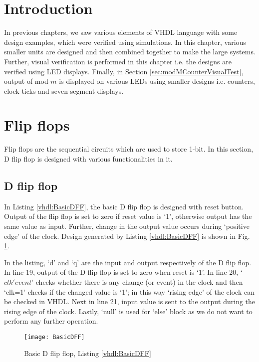 \section{Introduction}
In previous chapters, we saw various elements of VHDL language with some design examples, which were verified using simulations. In this chapter, various smaller units are designed and then combined together to make the large systems. Further, visual verification is performed in this chapter i.e. the designs are verified using LED displays. Finally, in Section \ref{sec:modMCounterVisualTest}, output of mod-$m$ is displayed on various LEDs using smaller designs i.e. counters, clock-ticks and seven segment displays. 

\section{Flip flops}
Flip flops are the sequential circuits which are used  to store 1-bit. In this section, D flip flop is designed with various functionalities in it.
 
\subsection{D flip flop}
In Listing \ref{vhdl:BasicDFF}, the basic D flip flop is designed with reset button. Output of the flip flop is set to zero if reset value is `1', otherwise output has the same value as input. Further, change in the output value occurs during `positive edge' of the clock. Design generated by Listing \ref{vhdl:BasicDFF} is shown in Fig. \ref{fig:BasicDFF}.

\begin{explanation} 
	In the listing, `d' and `q' are the input and output respectively of the D flip flop. In line 19, output of the D flip flop is set to zero when reset is `1'. In line 20, `$clk'event$' checks whether there is any change (or event) in the clock and then `clk=1' checks if the changed value is `1'; in this way `rising edge' of the clock can be checked in VHDL. Next in line 21, input value is sent to the output during the rising edge of the clock. Lastly, `null' is used for `else' block as we do not want to perform any further operation.
\end{explanation}


\begin{figure}[!h]
	\centering
	\texttt{[image: BasicDFF]}
	\caption{Basic D flip flop, Listing \ref{vhdl:BasicDFF}}
	\label{fig:BasicDFF}
\end{figure}

